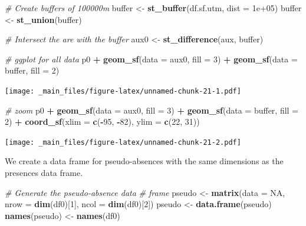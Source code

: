 \documentclass[
]{book}
\newenvironment{Shaded}{\begin{snugshade}}{\end{snugshade}}
\newcommand{\AttributeTok}[1]{\textcolor[rgb]{0.13,0.29,0.53}{#1}}
\newcommand{\CommentTok}[1]{\textcolor[rgb]{0.56,0.35,0.01}{\textit{#1}}}
\newcommand{\ConstantTok}[1]{\textcolor[rgb]{0.56,0.35,0.01}{#1}}
\newcommand{\DecValTok}[1]{\textcolor[rgb]{0.00,0.00,0.81}{#1}}
\newcommand{\FloatTok}[1]{\textcolor[rgb]{0.00,0.00,0.81}{#1}}
\newcommand{\FunctionTok}[1]{\textcolor[rgb]{0.13,0.29,0.53}{\textbf{#1}}}
\newcommand{\NormalTok}[1]{#1}
\newcommand{\OtherTok}[1]{\textcolor[rgb]{0.56,0.35,0.01}{#1}}
\newcommand{\SpecialCharTok}[1]{\textcolor[rgb]{0.81,0.36,0.00}{\textbf{#1}}}
\begin{document}
\begin{Shaded}
\begin{Highlighting}[]
\CommentTok{\# Create buffers of 100000m}
\NormalTok{buffer }\OtherTok{\textless{}{-}} \FunctionTok{st\_buffer}\NormalTok{(df.sf.utm, }\AttributeTok{dist =} \FloatTok{1e+05}\NormalTok{)}
\NormalTok{buffer }\OtherTok{\textless{}{-}} \FunctionTok{st\_union}\NormalTok{(buffer)}

\CommentTok{\# Intersect the are with the buffer}
\NormalTok{aux0 }\OtherTok{\textless{}{-}} \FunctionTok{st\_difference}\NormalTok{(aux, buffer)}

\CommentTok{\# ggplot for all data}
\NormalTok{p0 }\SpecialCharTok{+} \FunctionTok{geom\_sf}\NormalTok{(}\AttributeTok{data =}\NormalTok{ aux0, }\AttributeTok{fill =} \DecValTok{3}\NormalTok{) }\SpecialCharTok{+} \FunctionTok{geom\_sf}\NormalTok{(}\AttributeTok{data =}\NormalTok{ buffer,}
    \AttributeTok{fill =} \DecValTok{2}\NormalTok{)}
\end{Highlighting}
\end{Shaded}

\texttt{[image: \_main\_files/figure-latex/unnamed-chunk-21-1.pdf]}

\begin{Shaded}
\begin{Highlighting}[]
\CommentTok{\# zoom}
\NormalTok{p0 }\SpecialCharTok{+} \FunctionTok{geom\_sf}\NormalTok{(}\AttributeTok{data =}\NormalTok{ aux0, }\AttributeTok{fill =} \DecValTok{3}\NormalTok{) }\SpecialCharTok{+} \FunctionTok{geom\_sf}\NormalTok{(}\AttributeTok{data =}\NormalTok{ buffer,}
    \AttributeTok{fill =} \DecValTok{2}\NormalTok{) }\SpecialCharTok{+} \FunctionTok{coord\_sf}\NormalTok{(}\AttributeTok{xlim =} \FunctionTok{c}\NormalTok{(}\SpecialCharTok{{-}}\DecValTok{95}\NormalTok{, }\SpecialCharTok{{-}}\DecValTok{82}\NormalTok{),}
    \AttributeTok{ylim =} \FunctionTok{c}\NormalTok{(}\DecValTok{22}\NormalTok{, }\DecValTok{31}\NormalTok{))}
\end{Highlighting}
\end{Shaded}

\texttt{[image: \_main\_files/figure-latex/unnamed-chunk-21-2.pdf]}

We create a data frame for pseudo-absences with the same dimensions as the presences data frame.

\begin{Shaded}
\begin{Highlighting}[]
\CommentTok{\# Generate the pseudo{-}absence data}
\CommentTok{\# frame}
\NormalTok{pseudo }\OtherTok{\textless{}{-}} \FunctionTok{matrix}\NormalTok{(}\AttributeTok{data =} \ConstantTok{NA}\NormalTok{, }\AttributeTok{nrow =} \FunctionTok{dim}\NormalTok{(df0)[}\DecValTok{1}\NormalTok{],}
    \AttributeTok{ncol =} \FunctionTok{dim}\NormalTok{(df0)[}\DecValTok{2}\NormalTok{])}
\NormalTok{pseudo }\OtherTok{\textless{}{-}} \FunctionTok{data.frame}\NormalTok{(pseudo)}
\FunctionTok{names}\NormalTok{(pseudo) }\OtherTok{\textless{}{-}} \FunctionTok{names}\NormalTok{(df0)}
\end{Highlighting}
\end{Shaded}
\end{document}
